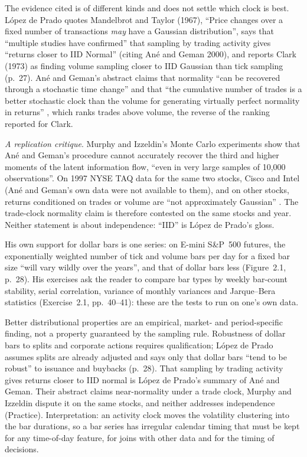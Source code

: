 \begin{qfmethod}
 The evidence cited is of different kinds and does not settle which clock is best. López de Prado quotes Mandelbrot and Taylor (1967), ``Price changes over a fixed number of transactions \emph{may} have a Gaussian distribution'', says that ``multiple studies have confirmed'' that sampling by trading activity gives ``returns closer to IID Normal'' (citing Ané and Geman 2000), and reports Clark (1973) as finding volume sampling closer to IID Gaussian than tick sampling (p.~27). Ané and Geman's abstract claims that normality ``can be recovered through a stochastic time change'' and that ``the cumulative number of trades is a better stochastic clock than the volume for generating virtually perfect normality in returns'' \citep[abstract]{ane-geman-2000}, which ranks trades above volume, the reverse of the ranking reported for Clark.

\emph{A replication critique}. Murphy and Izzeldin's Monte Carlo experiments show that Ané and Geman's procedure cannot accurately recover the third and higher moments of the latent information flow, ``even in very large samples of 10,000 observations''. On 1997 NYSE TAQ data for the same two stocks, Cisco and Intel (Ané and Geman's own data were not available to them), and on other stocks, returns conditioned on trades or volume are ``not approximately Gaussian'' \citep[version of December 2006, abstract and secs.~1 and~4--6]{murphy-izzeldin-2006}. The trade-clock normality claim is therefore contested on the same stocks and year. Neither statement is about independence: ``IID'' is López de Prado's gloss.

His own support for dollar bars is one series: on E-mini S\&P~500 futures, the exponentially weighted number of tick and volume bars per day for a fixed bar size ``will vary wildly over the years'', and that of dollar bars less (Figure~2.1, p.~28). His exercises ask the reader to compare bar types by weekly bar-count stability, serial correlation, variance of monthly variances and Jarque--Bera statistics (Exercise~2.1, pp.~40--41): these are the tests to run on one's own data.

 Better distributional properties are an empirical, market- and period-specific finding, not a property guaranteed by the sampling rule. Robustness of dollar bars to splits and corporate actions requires qualification; López de Prado assumes splits are already adjusted and says only that dollar bars ``tend to be robust'' to issuance and buybacks (p.~28). That sampling by trading activity gives returns closer to IID normal is López de Prado's summary of Ané and Geman. Their abstract claims near-normality under a trade clock, Murphy and Izzeldin dispute it on the same stocks, and neither addresses independence (Practice). Interpretation: an activity clock moves the volatility clustering into the bar durations, so a bar series has irregular calendar timing that must be kept for any time-of-day feature, for joins with other data and for the timing of decisions.


\end{qfmethod}
